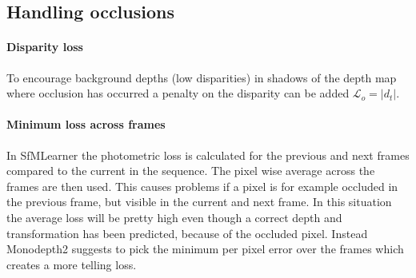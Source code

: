 \subsection{Handling occlusions}
\label{sec:occlusion}

\paragraph{Disparity loss} To encourage background depths (low disparities) in shadows of the depth map where occlusion has occurred a penalty on the disparity can be added $ \mathcal{L}_{o} =|d_t|. $

\paragraph{Minimum loss across frames} In SfMLearner the photometric loss is calculated for the previous and next frames compared to the current in the sequence. The pixel wise average across the frames are then used. This causes problems if a pixel is for example occluded in the previous frame, but visible in the current and next frame. In this situation the average loss will be pretty high even though a correct depth and transformation has been predicted, because of the occluded pixel. Instead Monodepth2 suggests to pick the minimum per pixel error over the frames which creates a more telling loss. 

